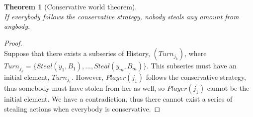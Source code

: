 \documentclass[11pt]{article}
\newtheorem{theorem}{Theorem}[section]
\theoremstyle{definition}
\theoremstyle{corollary}
\theoremstyle{lemma}
\begin{document}

    \begin{theorem}[Conservative world theorem] \ \\
    \label{conservativeworld}
       If everybody follows the conservative strategy, nobody steals any amount from anybody.
    \end{theorem}
    \begin{proof} \ \\
       Suppose that there exists a subseries of History, $(Turn_{j_k})$, where $Turn_{j_k} = \{Steal(y_1,B_1),...,
       Steal(y_m,B_m)\}$. This subseries must have an initial element, $Turn_{j_1}$. However, $Player(j_1)$ follows the conservative
       strategy, thus somebody must have stolen from her as well, so $Player(j_1)$ cannot be the initial element. We have a
       contradiction, thus there cannot exist a series of stealing actions when everybody is conservative.
    \end{proof}
\end{document}
